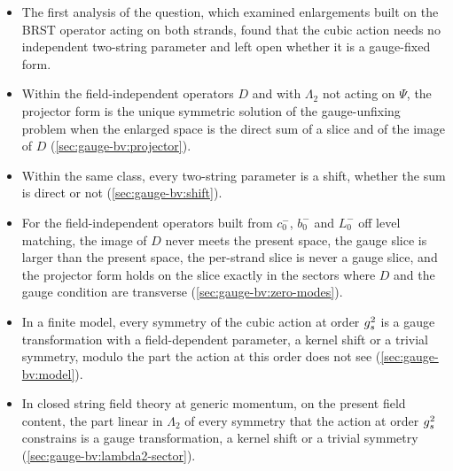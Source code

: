 \begin{itemize}
  \setlength{\itemsep}{1ex}

  \item The first analysis of the question, which examined enlargements built on the BRST operator acting on both strands, found that the cubic action needs no independent two-string parameter and left open whether it is a gauge-fixed form.


  \item Within the field-independent operators $D$ and with $\Lambda_2$ not acting on $\Psi$, the projector form is the unique symmetric solution of the gauge-unfixing problem when the enlarged space is the direct sum of a slice and of the image of $D$ (\cref{sec:gauge-bv:projector}).


  \item Within the same class, every two-string parameter is a shift, whether the sum is direct or not (\cref{sec:gauge-bv:shift}).


  \item For the field-independent operators built from $c_0^-$, $b_0^-$ and $L_0^-$ off level matching, the image of $D$ never meets the present space, the gauge slice is larger than the present space, the per-strand slice is never a gauge slice, and the projector form holds on the slice exactly in the sectors where $D$ and the gauge condition are transverse (\cref{sec:gauge-bv:zero-modes}).


  \item In a finite model, every symmetry of the cubic action at order $g_s^2$ is a gauge transformation with a field-dependent parameter, a kernel shift or a trivial symmetry, modulo the part the action at this order does not see (\cref{sec:gauge-bv:model}).


  \item In closed string field theory at generic momentum, on the present field content, the part linear in $\Lambda_2$ of every symmetry that the action at order $g_s^2$ constrains is a gauge transformation, a kernel shift or a trivial symmetry (\cref{sec:gauge-bv:lambda2-sector}).


\end{itemize}
